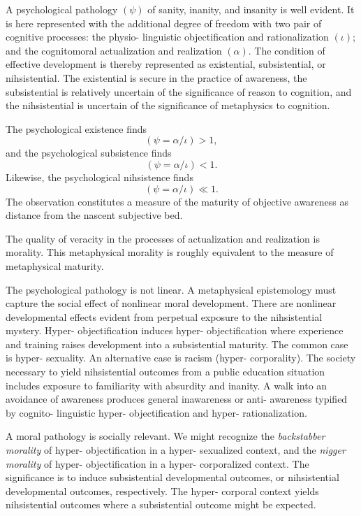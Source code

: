 A psychological pathology $(\psi)$ of sanity, inanity, and insanity is
well evident.  It is here represented with the additional degree of
freedom with two pair of cognitive processes: the physio- linguistic
objectification and rationalization $(\iota)$; and the cognitomoral
actualization and realization $(\alpha)$.  The condition of effective
development is thereby represented as existential, subsistential, or
nihsistential.  The existential is secure in the practice of
awareness, the subsistential is relatively uncertain of the
significance of reason to cognition, and the nihsistential is
uncertain of the significance of metaphysics to cognition.

The psychological existence finds
$$
 ( \psi = {\alpha}/{\iota} ) > 1,
$$
and the psychological subsistence finds
$$
 ( \psi = {\alpha}/{\iota} ) < 1 .
$$
Likewise, the psychological nihsistence finds
$$
 ( \psi = {\alpha}/{\iota} ) \ll 1 .
$$
The observation constitutes a measure of the maturity of objective
awareness as distance from the nascent subjective bed.  

The quality of veracity in the processes of actualization and
realization is morality.  This metaphysical morality is roughly
equivalent to the measure of metaphysical maturity.

The psychological pathology is not linear.  A metaphysical
epistemology must capture the social effect of nonlinear moral
development.  There are nonlinear developmental effects evident from
perpetual exposure to the nihsistential mystery.  Hyper-
objectification induces hyper- objectification where experience and
training raises development into a subsistential maturity.  The common
case is hyper- sexuality.  An alternative case is racism (hyper-
corporality).  The society necessary to yield nihsistential outcomes
from a public education situation includes exposure to familiarity
with absurdity and inanity.  A walk into an avoidance of awareness
produces general inawareness or anti- awareness typified by cognito-
linguistic hyper- objectification and hyper- rationalization.

A moral pathology is socially relevant.  We might recognize the {\it
backstabber morality} of hyper- objectification in a hyper- sexualized
context, and the {\it nigger morality} of hyper- objectification in a
hyper- corporalized context.  The significance is to induce
subsistential developmental outcomes, or nihsistential developmental
outcomes, respectively.  The hyper- corporal context yields
nihsistential outcomes where a subsistential outcome might be
expected.

